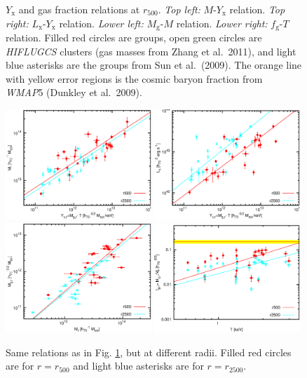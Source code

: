 \documentclass[structabstract]{aa}
\begin{document}
\begin{figure}
   \caption{$Y_{\text{x}}$ and gas fraction relations at
     $r_{500}$. \emph{Top left:} $M$-$Y_{\text{x}}$
     relation. \emph{Top right:} $L_{\text{x}}$-$Y_{\text{x}}$
     relation. \emph{Lower left:} $M_{\text{g}}$-$M$
     relation. \emph{Lower right:} $f_{\text{g}}$-$T$
     relation. Filled red circles are groups, open green circles are
     \emph{HIFLUGCS} clusters (gas masses from Zhang et al.\ 2011), and light blue asterisks are the groups from Sun
     et al.\ (2009). The orange line with yellow error regions is
     the cosmic baryon fraction from \emph{WMAP}5 (Dunkley et al.\
     2009).}
              \label{fig:yxfgrelation}%
\end{figure}
\begin{figure}
   \centering
   \includegraphics[width=0.49\textwidth]{yx_m_radii_c.eps}\quad
   \includegraphics[width=0.49\textwidth]{lyhda_radii_c.eps}\\\medskip
   \includegraphics[width=0.49\textwidth]{mg_m_radii_c.eps}\quad
   \includegraphics[width=0.49\textwidth]{fg_t_radii_c.eps}
   \caption{Same relations as in Fig. \ref{fig:yxfgrelation}, but at different
     radii. Filled red circles are for $r=r_{500}$
     and light blue asterisks are for $r=r_{2500}$.}
              \label{fig:yxfgrelation_radii}%
\end{figure}
\end{document}
